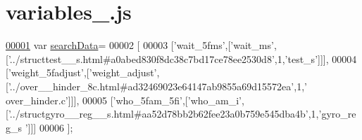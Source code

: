 \hypertarget{variables__16_8js_source}{}\section{variables\+\_.\+js}
\label{variables__16_8js_source}

\begin{DoxyCode}
\hypertarget{variables__16_8js_source.tex_l00001}{}\hyperlink{variables__16_8js_ad01a7523f103d6242ef9b0451861231e}{00001} var \hyperlink{variables__16_8js_ad01a7523f103d6242ef9b0451861231e}{searchData}=
00002 [
00003   [\textcolor{stringliteral}{'wait\_5fms'},[\textcolor{stringliteral}{'wait\_ms'},[\textcolor{stringliteral}{'../structtest\_\_s.html#a0abed830f8dc38c7bd17ce78ee2530d8'},1,\textcolor{stringliteral}{'test\_s'}]]],
00004   [\textcolor{stringliteral}{'weight\_5fadjust'},[\textcolor{stringliteral}{'weight\_adjust'},[\textcolor{stringliteral}{'../over\_\_hinder\_8c.html#ad32469023e64147ab9855a69d15572ea'},1,\textcolor{stringliteral}{'
      over\_hinder.c'}]]],
00005   [\textcolor{stringliteral}{'who\_5fam\_5fi'},[\textcolor{stringliteral}{'who\_am\_i'},[\textcolor{stringliteral}{'../structgyro\_\_reg\_\_s.html#aa52d78bb2b62fee23a0b759e545dba4b'},1,\textcolor{stringliteral}{'gyro\_reg\_s
      '}]]]
00006 ];
\end{DoxyCode}
